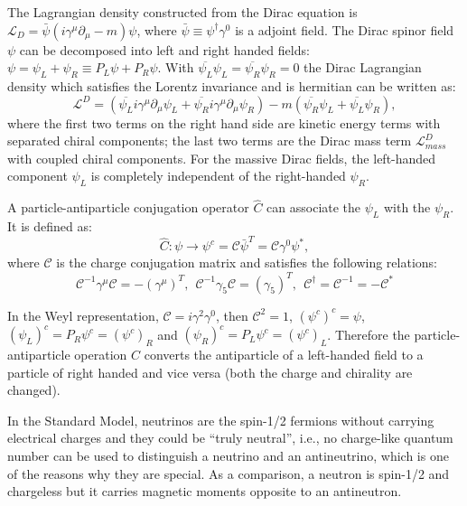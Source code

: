 The Lagrangian density constructed from the Dirac equation is $\mathcal{L}_D = \bar\psi(i\gamma^\mu\partial_\mu-m)\psi$, where $\bar{\psi}\equiv \psi^{\dag}\gamma^0$ is a adjoint field. The Dirac spinor field $\psi$ can be decomposed into left and right handed fields: $\psi=\psi_L+\psi_R\equiv P_L\psi+P_R\psi$. With $\overline{\psi_L}\psi_L=\overline{\psi_R}\psi_R=0$ the Dirac Lagrangian density which satisfies the Lorentz invariance and is hermitian can be written as\cite{zee2010quantum}:
\begin{equation}\label{diracLagrange}
\mathcal{L}^D = (\overline{\psi_L} i\gamma^\mu\partial_\mu\psi_L+\overline{{\psi}_R} i\gamma^\mu\partial_\mu\psi_R)-m(\overline{{\psi}_R}\psi_L+\overline{{\psi}_L}\psi_R),
\end{equation} 
where the first two terms on the right hand side are kinetic energy terms with separated chiral components; the last two terms are the Dirac mass term $\mathcal{L}^{D}_{mass}$ with coupled chiral components. For the massive Dirac fields, the left-handed component $\psi_L$ is completely independent of the right-handed $\psi_R$. 

A particle-antiparticle conjugation operator $\hat C$ can associate the $\psi_L$ with the $\psi_R$. It is defined as\cite{akhmedov2014majorana}:
\begin{equation}
\hat C: \psi\to \psi^c=\mathcal{C}\bar\psi^T=\mathcal{C}\gamma^0\psi^*,
\end{equation}
where $\mathcal C$ is the charge conjugation matrix and satisfies the following relations:
\begin{equation}
\mathcal C^{-1}\gamma^\mu\mathcal C=-(\gamma^\mu)^T,~~\mathcal{C}^{-1}\gamma_5\mathcal{C}=(\gamma_5)^T,~~\mathcal{C}^\dagger = \mathcal{C}^{-1}=-\mathcal{C}^*
\end{equation}

In the Weyl representation, $\mathcal{C}=i\gamma^2\gamma^0$, then $\mathcal {C}^2=1$, $(\psi^c)^c=\psi$, $(\psi_L)^c=P_R\psi^c=(\psi^c)_R$ and $(\psi_R)^c=P_L\psi^c=(\psi^c)_L$. Therefore the particle-antiparticle operation $\hat C$ converts the antiparticle of a left-handed field to a particle of right handed and vice versa (both the charge and chirality are changed).

In the Standard Model, neutrinos are the spin-1/2 fermions without carrying electrical charges and they could be ``truly neutral'', i.e., no charge-like quantum number can be used to distinguish a neutrino and an antineutrino, which is one of the reasons why they are special. As a comparison, a neutron is spin-1/2 and chargeless but it carries magnetic moments opposite to an antineutron\cite{akhmedov2014majorana}.

